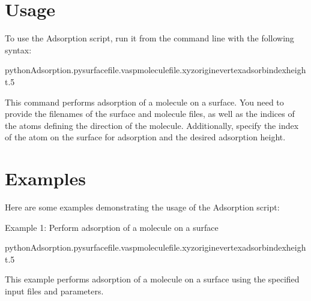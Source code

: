 \documentclass[letterpaper,10pt,english]{sphinxmanual}
\begin{document}
\sphinxstepscope


\section{Usage}
\label{\detokenize{usage:usage}}\label{\detokenize{usage::doc}}
\sphinxAtStartPar
To use the Adsorption script, run it from the command line with the following syntax:

\begin{sphinxVerbatim}[commandchars=\\\{\}]
pythonAdsorption.pysurface\PYGZus{}file.vaspmolecule\PYGZus{}file.xyz\PYGZhy{}\PYGZhy{}origine\PYGZhy{}\PYGZhy{}vertex\PYGZhy{}\PYGZhy{}adsorb\PYGZus{}index\PYGZhy{}\PYGZhy{}height.5
\end{sphinxVerbatim}

\sphinxAtStartPar
This command performs adsorption of a molecule on a surface. You need to provide the filenames of the surface and molecule files, as well as the indices of the atoms defining the direction of the molecule. Additionally, specify the index of the atom on the surface for adsorption and the desired adsorption height.

\sphinxstepscope


\section{Examples}
\label{\detokenize{examples:examples}}\label{\detokenize{examples::doc}}
\sphinxAtStartPar
Here are some examples demonstrating the usage of the Adsorption script:

\sphinxAtStartPar
Example 1: Perform adsorption of a molecule on a surface

\begin{sphinxVerbatim}[commandchars=\\\{\}]
pythonAdsorption.pysurface\PYGZus{}file.vaspmolecule\PYGZus{}file.xyz\PYGZhy{}\PYGZhy{}origine\PYGZhy{}\PYGZhy{}vertex\PYGZhy{}\PYGZhy{}adsorb\PYGZus{}index\PYGZhy{}\PYGZhy{}height.5
\end{sphinxVerbatim}

\sphinxAtStartPar
This example performs adsorption of a molecule on a surface using the specified input files and parameters.
\end{document}
